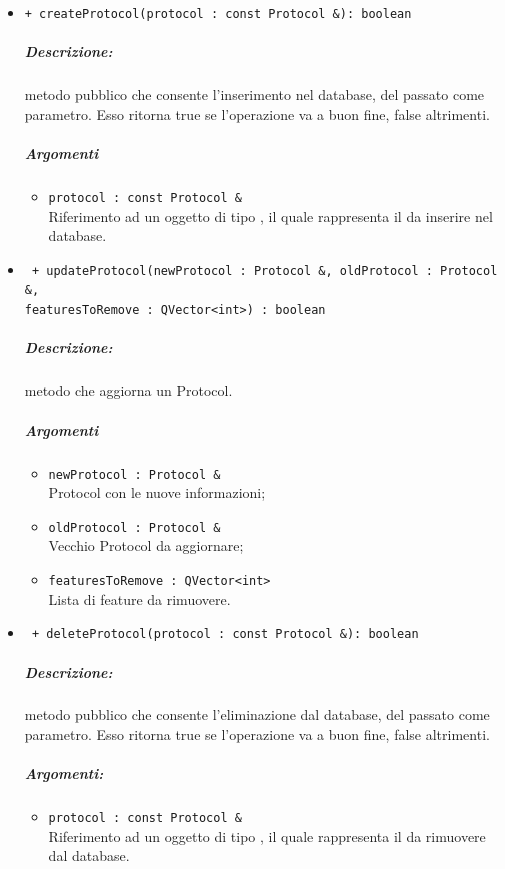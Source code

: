 \begin{itemize}
	\item \color{blue}\verb!+ createProtocol(protocol : const Protocol &): boolean!
	\color{black} 
	\subparagraph{Descrizione:} metodo pubblico che consente l'inserimento nel database, del \protocol{} passato come parametro. Esso ritorna true se l'operazione va a buon fine, false altrimenti.
	\subparagraph{Argomenti}
	\begin{itemize}
		\item \color{RoyalPurple}\verb!protocol : const Protocol &! \\ 
		\color{black}Riferimento ad un oggetto di tipo \protocol{}, il quale rappresenta il \protocol{} da inserire nel database.
	\end{itemize}

	\item \color{blue}\verb! + updateProtocol(newProtocol : Protocol &, oldProtocol : Protocol &, !\\
								\verb!featuresToRemove : QVector<int>) : boolean!
	\color{black}
	\subparagraph{Descrizione:} metodo che aggiorna un Protocol\g{}.
	\subparagraph{Argomenti}
		\begin{itemize}
			\item \color{RoyalPurple}\verb!newProtocol : Protocol &!\\
			\color{black}Protocol\g{} con le nuove informazioni;
			
			\item \color{RoyalPurple}\verb!oldProtocol : Protocol &!\\
			\color{black}Vecchio Protocol\g{} da aggiornare;
			
			\item \color{RoyalPurple}\verb!featuresToRemove : QVector<int>!\\
			\color{black}Lista di feature\g{} da rimuovere.
		\end{itemize}
		
	\item \color{blue}\verb! + deleteProtocol(protocol : const Protocol &): boolean!\\
	\color{black}
	\subparagraph{Descrizione:} metodo pubblico che consente l'eliminazione dal database, del \protocol{} passato come parametro. Esso ritorna true se l'operazione va a buon fine, false altrimenti.
	\subparagraph{Argomenti:}
	\begin{itemize}
			\item\color{RoyalPurple} \verb!protocol : const Protocol &! \\
			\color{black}Riferimento ad un oggetto di tipo \protocol{}, il quale rappresenta il \protocol{} da rimuovere dal database.
	\end{itemize}
	

\end{itemize}
